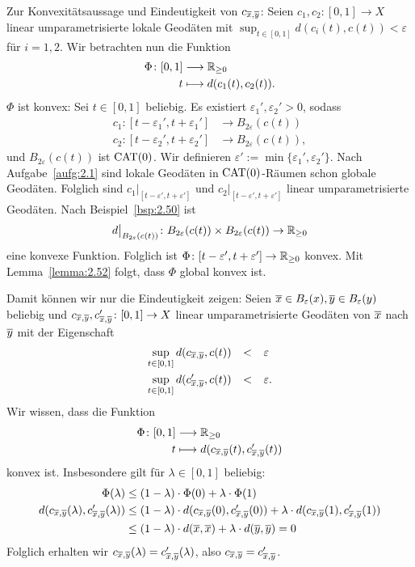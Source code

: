 \begin{beweis}
	Zur Konvexitätsaussage und Eindeutigkeit von $c_{\overline{x},\overline{y}}$:
	Seien $c_1,c_2 \colon [0,1] \rightarrow X$ linear umparametrisierte lokale Geodäten mit $\sup_{t \in [0,1]} d(c_i(t),c(t)) < \varepsilon$ für $i = 1,2$.
	Wir betrachten nun die Funktion
	\begin{align*}
		\Phi\colon [0,1] &\longrightarrow \mathbb{R}_{\geq 0} \\
		t &\longmapsto d(c_1(t),c_2(t)).
	\end{align*}
	$\Phi$ ist konvex:
	Sei $t \in [0,1]$ beliebig.
	Es existiert $\varepsilon_1', \varepsilon_2' > 0$, sodass
	\begin{align*}
		c_1 \colon [t- \varepsilon_1', t+ \varepsilon_1'] &\longrightarrow B_{2\varepsilon}(c(t)) \\
		c_2 \colon [t-\varepsilon_2', t+\varepsilon_2'] &\longrightarrow B_{2\varepsilon}(c(t)),
	\end{align*}
	und $B_{2\varepsilon}(c(t))$ ist $\operatorname{CAT(0)}$.
	Wir definieren $\varepsilon' := \min\{ \varepsilon_1',\varepsilon_2'\}$.
	Nach Aufgabe~\ref{aufg:2.1} sind lokale Geodäten in $\operatorname{CAT(0)}$-Räumen schon globale Geodäten.
	Folglich sind  $c_1 \big|_{[t-\varepsilon',t+\varepsilon']}$ und $c_2 \big|_{[t-\varepsilon',t+\varepsilon']}$ linear umparametrisierte Geodäten.
	Nach Beispiel~\ref{bsp:2.50} ist
	\[
	d \big|_{B_{2\varepsilon}(c(t))} \colon B_{2\varepsilon}(c(t)) \times B_{2\varepsilon}(c(t)) \rightarrow \mathbb{R}_{\geq 0}
	\]
	eine konvexe Funktion. Folglich ist $\Phi \colon [t- \varepsilon',t+\varepsilon'] \rightarrow \mathbb{R}_{\geq 0}$ konvex.
	Mit Lemma~\ref{lemma:2.52} folgt, dass $\Phi$ global konvex ist.
	
	Damit können wir nur die Eindeutigkeit zeigen:
	Seien $\overline{x} \in B_\varepsilon(x), \overline{y} \in B_\varepsilon(y)$ beliebig und $c_{\overline{x},\overline{y}}, c_{\overline{x},\overline{y}}' \colon [0,1] \rightarrow X$ linear umparametrisierte Geodäten von $\overline{x}$ nach $\overline{y}$ mit der Eigenschaft
	\begin{align*}
		\sup_{t\in [0,1]} d(c_{\ol{x},\ol{y}}, c(t)) &\stack{}{<} \varepsilon \\
		\sup_{t \in [0,1]} d(c_{\ol{x},\ol{y}}',c(t)) &\stack{}{<} \varepsilon.
	\end{align*}
	Wir wissen, dass die Funktion
	\begin{align*}
		\Phi\colon [0,1] &\longrightarrow \mathbb{R}_{\geq 0} \\
		t &\longmapsto d(c_{\overline{x},\overline{y}}(t),c_{\overline{x},\overline{y}}'(t))
	\end{align*}
	konvex ist.
	Insbesondere gilt für $\lambda \in [0,1]$ beliebig:
	\begin{align*}
		\Phi(\lambda) &\leq (1-\lambda) \cdot \Phi(0) + \lambda \cdot \Phi(1) \\
		d(c_{\overline{x},\overline{y}}(\lambda),c_{\overline{x},\overline{y}}'(\lambda)) &\leq (1-\lambda) \cdot d(c_{\overline{x},\overline{y}}(0),c_{\overline{x},\overline{y}}'(0)) + \lambda \cdot d(c_{\overline{x},\overline{y}}(1),c_{\overline{x},\overline{y}}'(1)) \\
		&\leq (1-\lambda) \cdot d(\overline{x},\overline{x}) + \lambda \cdot d(\overline{y},\overline{y}) = 0
	\end{align*}
	Folglich erhalten wir $c_{\overline{x},\overline{y}}(\lambda) = c_{\overline{x},\overline{y}}'(\lambda)$, also $c_{\overline{x},\overline{y}} = c_{\overline{x},\overline{y}}'$.
					

\end{beweis}
